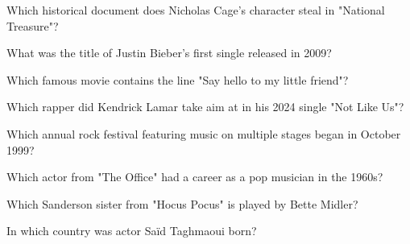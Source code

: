 \documentclass[12pt,a4paper]{book}
\begin{document}
\begin{enhancedmcq}[Question 43]{Which historical document does Nicholas Cage's character steal in "National Treasure"?}
\end{enhancedmcq}

\begin{enhancedmcq}[Question 44]{What was the title of Justin Bieber's first single released in 2009?}
\end{enhancedmcq}

\begin{enhancedmcq}[Question 45]{Which famous movie contains the line "Say hello to my little friend"?}
\end{enhancedmcq}

\begin{enhancedmcq}[Question 46]{Which rapper did Kendrick Lamar take aim at in his 2024 single "Not Like Us"?}
\end{enhancedmcq}

\begin{enhancedmcq}[Question 47]{Which annual rock festival featuring music on multiple stages began in October 1999?}
\end{enhancedmcq}

\begin{enhancedmcq}[Question 48]{Which actor from "The Office" had a career as a pop musician in the 1960s?}
\end{enhancedmcq}

\begin{enhancedmcq}[Question 49]{Which Sanderson sister from "Hocus Pocus" is played by Bette Midler?}
\end{enhancedmcq}

\begin{enhancedmcq}[Question 50]{In which country was actor Saïd Taghmaoui born?}
\end{enhancedmcq}
\end{document}
